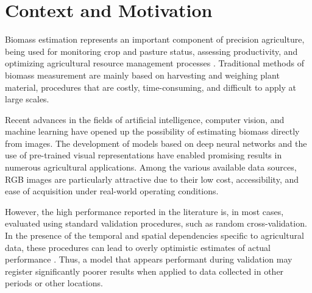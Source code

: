 

\section{Context and Motivation}

Biomass estimation represents an important component of precision agriculture, being used for monitoring crop and pasture status, assessing productivity, and optimizing agricultural resource management processes \cite{castro2020deep, karila2022grass}. Traditional methods of biomass measurement are mainly based on harvesting and weighing plant material, procedures that are costly, time-consuming, and difficult to apply at large scales.

Recent advances in the fields of artificial intelligence, computer vision, and machine learning have opened up the possibility of estimating biomass directly from images. The development of models based on deep neural networks and the use of pre-trained visual representations have enabled promising results in numerous agricultural applications. Among the various available data sources, RGB images are particularly attractive due to their low cost, accessibility, and ease of acquisition under real-world operating conditions.

However, the high performance reported in the literature is, in most cases, evaluated using standard validation procedures, such as random cross-validation. In the presence of the temporal and spatial dependencies specific to agricultural data, these procedures can lead to overly optimistic estimates of actual performance \cite{roberts2017cross, ploton2020spatial}. Thus, a model that appears performant during validation may register significantly poorer results when applied to data collected in other periods or other locations.

